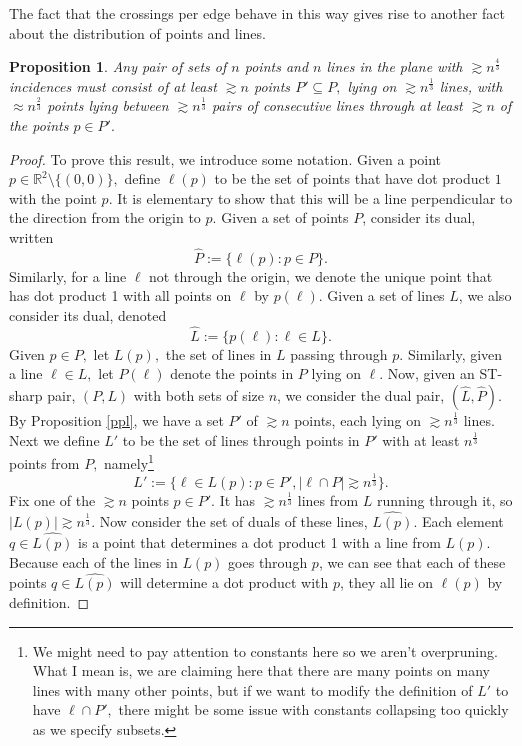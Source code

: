 \documentclass[12pt]{article}
\newtheorem{proposition}[theorem]{Proposition}
\begin{document}
The fact that the crossings per edge behave in this way gives rise to another fact about the distribution of points and lines.

\begin{proposition}\label{propellerProp}
Any pair of sets of $n$ points and $n$ lines in the plane with $\gtrsim n^\frac{4}{3}$ incidences must consist of at least $\gtrsim n$ points $P'\subseteq P,$ lying on $\gtrsim n^\frac{1}{3}$ lines, with $\approx n^\frac{2}{3}$ points lying between $\gtrsim n^\frac{1}{3}$ pairs of consecutive lines through at least $\gtrsim n$ of the points $p\in P'.$ 
\end{proposition}
\begin{proof}
To prove this result, we introduce some notation. Given a point $p\in \mathbb R^2\setminus \{(0,0)\},$ define $\ell(p)$ to be the set of points that have dot product $1$ with the point $p.$ It is elementary to show that this will be a line perpendicular to the direction from the origin to $p.$ Given a set of points $P$, consider its dual, written
\[\hat P := \{\ell(p):p\in P\}.\]
Similarly, for a line $\ell$ not through the origin, we denote the unique point that has dot product 1 with all points on $\ell$ by $p(\ell)$. Given a set of lines $L$, we also consider its dual, denoted
\[\hat L := \{p(\ell):\ell\in L\}.\]
Given $p\in P,$ let $L(p),$ the set of lines in $L$ passing through $p.$ Similarly, given a line $\ell\in L,$ let $P(\ell)$ denote the points in $P$ lying on $\ell.$
Now, given an ST-sharp pair, $(P,L)$ with both sets of size $n$, we consider the dual pair, $(\hat L, \hat P).$ By Proposition \ref{ppl}, we have a set $P'$ of $\gtrsim n$ points, each lying on $\gtrsim n^\frac{1}{3}$ lines. Next we define $L'$ to be the set of lines through points in $P'$ with at least $n^\frac{1}{3}$ points from $P,$ namely\footnote{We might need to pay attention to constants here so we aren't overpruning. What I mean is, we are claiming here that there are many points on many lines with many other points, but if we want to modify the definition of $L'$ to have $\ell \cap P',$ there might be some issue with constants collapsing too quickly as we specify subsets.}
\[L':=\{\ell\in L(p): p\in P', |\ell \cap P|\gtrsim n^\frac{1}{3}\}.\]
Fix one of the $\gtrsim n$ points $p\in P'.$ It has $\gtrsim n^\frac{1}{3}$ lines from $L$ running through it, so $|L(p)|\gtrsim n^\frac{1}{3}$. Now consider the set of duals of these lines, $\widehat{L(p)}.$ Each element $q\in \widehat{L(p)}$ is a point that determines a dot product 1 with a line from $L(p).$ Because each of the lines in $L(p)$ goes through $p$, we can see that each of these points $q\in \widehat{L(p)}$ will determine a dot product with $p$, they all lie on $\ell(p)$ by definition.

\end{proof}
\end{document}
